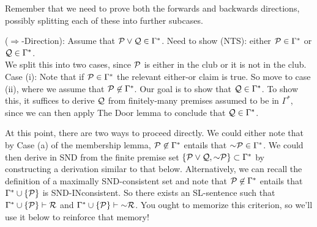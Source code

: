 \documentclass[12pt]{memoir}
\begin{document}
\begin{enumerate}[1.)]

Remember that we need to prove both the forwards and backwards directions, possibly splitting each of these into further subcases. 

($\Rightarrow$-Direction): Assume that ${\mathcal{P}} \lor {\ensuremath{\mathcal{Q}}} \in \Gamma^*$. Need to show (NTS): either ${\mathcal{P}} \in \Gamma^*$ or ${\mathcal{Q}} \in\Gamma^*$. \\ We split this into two cases, since ${\mathcal{P}}$ is either in the club or it is not in the club. \\ Case (i): Note that if ${\mathcal{P}} \in \Gamma^*$ the relevant either-or claim is true. So move to case (ii), where we assume that ${\mathcal{P}} \not\in \Gamma^*$. Our goal is to show that ${\mathcal{Q}} \in\Gamma^*$. To show this, it suffices to derive ${\mathcal{Q}}$ from finitely-many premises assumed to be in $\Gamma^*$, since we can then apply The Door lemma to conclude that ${\mathcal{Q}} \in\Gamma^*$. 

At this point, there are two ways to proceed directly. We could either note that by Case (a) of the membership lemma, ${\mathcal{P}} \not\in \Gamma^*$ entails that ${\enot \metav{P}} \in \Gamma^*$. We could then derive  in SND from the finite premise set $\{\metav{P} \eor \metav{Q}, \enot \metav{P} \} \subset \Gamma^*$ by constructing a derivation similar to that below. Alternatively, we can recall the definition of a maximally SND-consistent set and note that ${\mathcal{P}} \not\in \Gamma^*$ entails that $\Gamma^*\cup \{{\mathcal{P}}\}$ is SND-INconsistent. So there exists an SL-sentence  such that $\Gamma^*\cup \{{\mathcal{P}}\} \vdash {\ensuremath{\mathcal{R}}}$ and  $\Gamma^*\cup \{{\metav{P}}\} \vdash \sim{\metav{R}}$. You ought to memorize this criterion, so we'll use it below to reinforce that memory! 


\end{enumerate}
\end{document}

